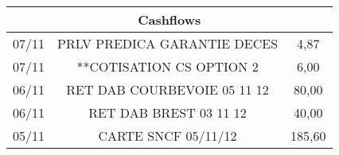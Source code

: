 \begin{longtable}{|c|c|c|}
\hline
\multicolumn{3}{|c|}{Cashflows} \\
\hline
07/11 & PRLV   PREDICA GARANTIE DECES & 4,87 \\
\hline
07/11 & **COTISATION CS OPTION 2 & 6,00 \\
\hline
06/11 & RET DAB COURBEVOIE     05 11 12 & 80,00 \\
\hline
06/11 & RET DAB BREST          03 11 12 & 40,00 \\
\hline
05/11 & CARTE SNCF             05/11/12 & 185,60 \\
\hline
\end{longtable}
